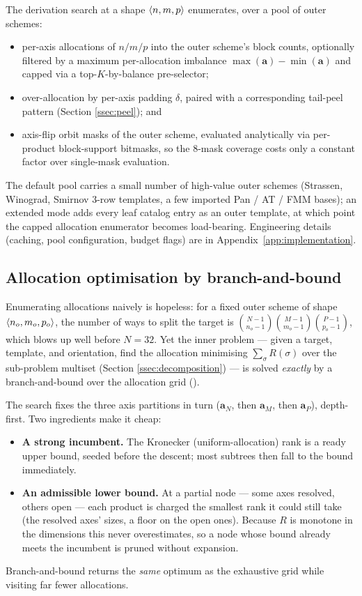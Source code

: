 The derivation search at a shape \(\langle n, m, p \rangle\) enumerates,
over a pool of outer schemes:
\begin{itemize}[itemsep=2pt]
  \item per-axis allocations of \(n / m / p\) into the outer scheme's
    block counts, optionally filtered by a maximum per-allocation
    imbalance \(\max(\mathbf{a}) - \min(\mathbf{a})\) and capped via a
    top-\(K\)-by-balance pre-selector;
  \item over-allocation by per-axis padding \(\delta\), paired with a
    corresponding tail-peel pattern (Section \ref{ssec:peel}); and
  \item axis-flip orbit masks of the outer scheme, evaluated
    analytically via per-product block-support bitmasks, so the
    8-mask coverage costs only a constant factor over single-mask
    evaluation.
\end{itemize}
The default pool carries a small number of high-value outer schemes
(Strassen, Winograd, Smirnov 3-row templates, a few imported Pan / AT
/ FMM bases); an extended mode adds every leaf catalog entry as an
outer template, at which point the capped allocation enumerator
becomes load-bearing. Engineering details (caching, pool
configuration, budget flags) are in Appendix~\ref{app:implementation}.

\subsection{Allocation optimisation by branch-and-bound}\label{ssec:alloc-bnb}

Enumerating allocations naively is hopeless: for a fixed outer scheme of
shape \(\langle n_o, m_o, p_o \rangle\), the number of ways to split the target
is \(\binom{N-1}{n_o-1}\binom{M-1}{m_o-1}\binom{P-1}{p_o-1}\), which blows
up well before \(N = 32\). Yet the inner problem --- given a target,
template, and orientation, find the allocation minimising
\(\sum_{\sigma} R(\sigma)\) over the sub-problem multiset (Section
\ref{ssec:decomposition}) --- is solved \emph{exactly} by a
branch-and-bound over the allocation grid ().

The search fixes the three axis partitions in turn (\(\mathbf{a}_N\),
then \(\mathbf{a}_M\), then \(\mathbf{a}_P\)), depth-first. Two ingredients
make it cheap:
\begin{itemize}[itemsep=2pt]
  \item \textbf{A strong incumbent.} The Kronecker (uniform-allocation)
    rank is a ready upper bound, seeded before the descent; most subtrees
    then fall to the bound immediately.
  \item \textbf{An admissible lower bound.} At a partial node --- some
    axes resolved, others open --- each product is charged the smallest
    rank it could still take (the resolved axes' sizes, a floor on the
    open ones). Because \(R\) is monotone in the dimensions this never
    overestimates, so a node whose bound already meets the incumbent is
    pruned without expansion.
\end{itemize}
Branch-and-bound returns the \emph{same} optimum as the exhaustive grid
while visiting far fewer allocations.

